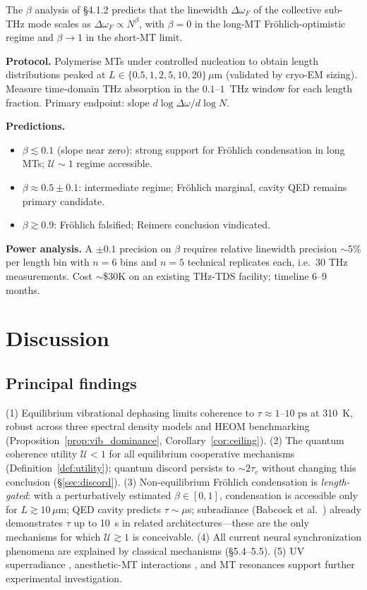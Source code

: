 \documentclass[twocolumn,10pt]{article}
\newcommand{\ps}{\text{~ps}}
\begin{document}
The $\beta$ analysis of \S 4.1.2 predicts that the linewidth
$\Delta\omega_F$ of the collective sub-THz mode scales as
$\Delta\omega_F\propto N^\beta$, with $\beta=0$ in the long-MT Fr\"ohlich-optimistic
regime and $\beta\to 1$ in the short-MT limit.

\textbf{Protocol.} Polymerise MTs under controlled nucleation to obtain
length distributions peaked at $L\in\{0.5,1,2,5,10,20\}\,\mu$m (validated
by cryo-EM sizing). Measure time-domain THz absorption in the
$0.1\text{--}1$~THz window for each length fraction. Primary endpoint:
slope $d\log\Delta\omega/d\log N$.

\textbf{Predictions.}
\begin{itemize}
\item $\beta\lesssim 0.1$ (slope near zero): strong support for
Fr\"ohlich condensation in long MTs; $\mathcal{U}\sim 1$ regime
accessible.
\item $\beta\approx 0.5\pm 0.1$: intermediate regime; Fr\"ohlich
marginal, cavity QED remains primary candidate.
\item $\beta\gtrsim 0.9$: Fr\"ohlich falsified; Reimers conclusion
vindicated.
\end{itemize}

\textbf{Power analysis.} A $\pm 0.1$ precision on $\beta$ requires
relative linewidth precision $\sim 5\%$ per length bin with $n=6$ bins
and $n=5$ technical replicates each, i.e.\ 30 THz measurements. Cost
$\sim$\$30K on an existing THz-TDS facility; timeline 6--9 months.



\section{Discussion}

\subsection{Principal findings}

(1) Equilibrium vibrational dephasing limits coherence to $\tau \approx
1\text{--}10\ps$ at 310~K, robust across three spectral density models
and HEOM benchmarking (Proposition~\ref{prop:vib_dominance},
Corollary~\ref{cor:ceiling}).
(2) The quantum coherence utility $\mathcal{U} < 1$ for all equilibrium
cooperative mechanisms (Definition~\ref{def:utility}); quantum discord
persists to $\sim 2\tau_c$ without changing this conclusion
(\S\ref{sec:discord}).
(3) Non-equilibrium Fr\"ohlich condensation is \emph{length-gated}: with
a perturbatively estimated $\beta\in[0,1]$, condensation is accessible
only for $L\gtrsim 10\,\mu$m; QED cavity predicts $\tau \sim \mu$s;
subradiance (Babcock et al.\ \cite{Babcock2024}) already demonstrates
$\tau$ up to 10~s in related architectures---these are the only
mechanisms for which $\mathcal{U} \gtrsim 1$ is conceivable.
(4) All current neural synchronization phenomena are explained by
classical mechanisms (\S 5.4--5.5).
(5) UV superradiance \cite{Babcock2024}, anesthetic-MT interactions
\cite{Khan2024,Kalra2023}, and MT resonances \cite{Saxena2020,Singh2021}
support further experimental investigation.
\end{document}
